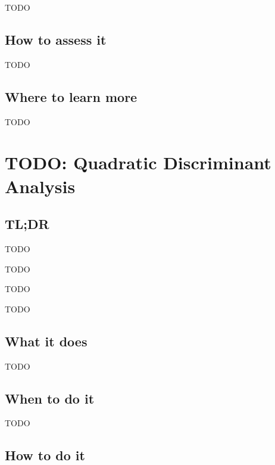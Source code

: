 \documentclass[
]{book}
\providecommand{\tightlist}{%
  \setlength{\itemsep}{0pt}\setlength{\parskip}{0pt}}
\begin{document}
TODO

\hypertarget{how-to-assess-it-4}{%
\section{How to assess it}\label{how-to-assess-it-4}}

TODO

\hypertarget{where-to-learn-more-4}{%
\section{Where to learn more}\label{where-to-learn-more-4}}

TODO

\hypertarget{quadratic-discriminant-analysis}{%
\chapter{TODO: Quadratic Discriminant Analysis}\label{quadratic-discriminant-analysis}}

\hypertarget{tldr-5}{%
\section{TL;DR}\label{tldr-5}}

\begin{description}
\tightlist
\item[What it does]
TODO
\item[When to do it]
TODO
\item[How to do it]
TODO
\item[How to assess it]
TODO
\end{description}

\hypertarget{what-it-does-5}{%
\section{What it does}\label{what-it-does-5}}

TODO

\hypertarget{when-to-do-it-5}{%
\section{When to do it}\label{when-to-do-it-5}}

TODO

\hypertarget{how-to-do-it-5}{%
\section{How to do it}\label{how-to-do-it-5}}
\end{document}
